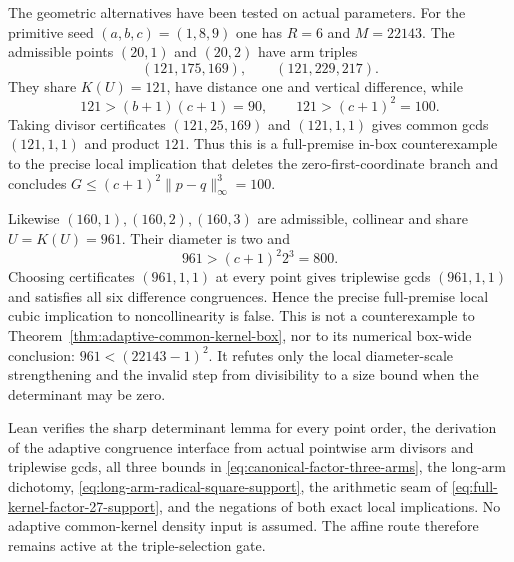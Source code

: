 The geometric alternatives have been tested on actual parameters.  For
the primitive seed $(a,b,c)=(1,8,9)$ one has $R=6$ and $M=22143$.
The admissible points $(20,1)$ and $(20,2)$ have arm triples
\[
 (121,175,169),\qquad(121,229,217).
\]
They share $K(U)=121$, have distance one and vertical difference, while
\[
       121>(b+1)(c+1)=90,\qquad121>(c+1)^2=100.
\]
Taking divisor certificates $(121,25,169)$ and $(121,1,1)$ gives common
gcds $(121,1,1)$ and product $121$.  Thus this is a full-premise in-box
counterexample to the precise local implication that deletes the
zero-first-coordinate branch and concludes
$G\le(c+1)^2\lVert p-q\rVert_\infty^3=100$.

Likewise $(160,1),(160,2),(160,3)$ are admissible, collinear and share
$U=K(U)=961$.  Their diameter is two and
\[
                    961>(c+1)^2 2^3=800.
\]
Choosing certificates $(961,1,1)$ at every point gives triplewise gcds
$(961,1,1)$ and satisfies all six difference congruences.  Hence the precise
full-premise local cubic implication to noncollinearity is false.  This is
not a counterexample to Theorem~\ref{thm:adaptive-common-kernel-box}, nor to
its numerical box-wide conclusion: $961<(22143-1)^2$.  It refutes only the
local diameter-scale strengthening and the invalid step from divisibility
to a size bound when the determinant may be zero.

Lean verifies the sharp determinant lemma for every point order, the
derivation of the adaptive congruence interface from actual pointwise arm
divisors and triplewise gcds, all three bounds in
\eqref{eq:canonical-factor-three-arms}, the long-arm dichotomy,
\eqref{eq:long-arm-radical-square-support},
the arithmetic seam of \eqref{eq:full-kernel-factor-27-support}, and the
negations of both exact local implications.  No adaptive common-kernel density
input is assumed.  The affine route therefore remains active at the
triple-selection gate.

